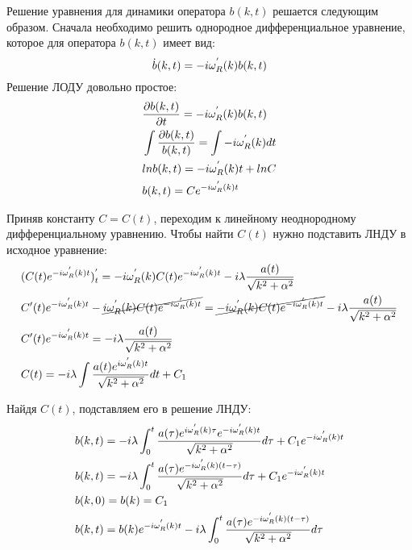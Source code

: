 Решение уравнения для динамики оператора $b(k,t)$ решается следующим образом. Сначала необходимо
решить однородное дифференциальное уравнение, которое для оператора $b(k,t)$ имеет вид:
\begin{equation}\notag
    \dot{b}(k,t) = -i \omega^{'}_{R}(k) b(k,t)
\end{equation}
Решение ЛОДУ довольно простое:
\begin{equation}\notag
    \begin{split}
        & \frac{\partial b(k,t)}{\partial t} = -i \omega^{'}_{R}(k) b(k,t) \\
        & \int \frac{\partial b(k,t)}{b(k,t)} = \int -i \omega^{'}_{R}(k) dt \\
        & ln b(k,t) = -i \omega^{'}_{R}(k) t + ln C \\
        & b(k,t) = Ce^{-i \omega^{'}_{R}(k) t} \\
    \end{split}
\end{equation}

Приняв константу $C = C(t)$, переходим к линейному неоднородному дифференциальному уравнению.
Чтобы найти $C(t)$ нужно подставить ЛНДУ в исходное уравнение:
\begin{equation}\notag
    \begin{split}
        & (C(t)e^{-i \omega^{'}_{R}(k) t})^{'}_{t} = -i \omega^{'}_{R}(k) C(t)e^{-i \omega^{'}_{R}(k) t} -i \lambda \frac{a(t)}{\sqrt{k^{2} + \alpha^{2}}} \\
        & C'(t)e^{-i \omega^{'}_{R}(k) t} - \cancel{i \omega^{'}_{R}(k) C(t)e^{-i \omega^{'}_{R}(k) t}} = \cancel{-i \omega^{'}_{R}(k) C(t)e^{-i \omega^{'}_{R}(k) t}} -i \lambda \frac{a(t)}{\sqrt{k^{2} + \alpha^{2}}} \\
        & C'(t)e^{-i \omega^{'}_{R}(k) t} = -i \lambda \frac{a(t)}{\sqrt{k^{2} + \alpha^{2}}} \\
        & C(t) = -i \lambda \int \frac{a(t)e^{i \omega^{'}_{R}(k) t}}{\sqrt{k^{2} + \alpha^{2}}} dt + C_{1}
    \end{split}
\end{equation}

Найдя $C(t)$, подставляем его в решение ЛНДУ:
\begin{equation}\notag
    \begin{split}
        & b(k,t) = -i \lambda \int_{0}^{t} \frac{a(\tau)e^{i \omega^{'}_{R}(k) \tau}e^{-i \omega^{'}_{R}(k) t}}{\sqrt{k^{2} + \alpha^{2}}} d\tau + C_{1}e^{-i \omega^{'}_{R}(k) t} \\
        & b(k,t) = -i \lambda \int_{0}^{t} \frac{a(\tau)e^{-i \omega^{'}_{R}(k) (t-\tau)}}{\sqrt{k^{2} + \alpha^{2}}} d\tau + C_{1}e^{-i \omega^{'}_{R}(k) t} \\
        & b(k,0) = b(k) = C_{1} \\
        & b(k,t) = b(k)e^{-i \omega^{'}_{R}(k) t} -i \lambda \int_{0}^{t} \frac{a(\tau)e^{-i \omega^{'}_{R}(k) (t-\tau)}}{\sqrt{k^{2} + \alpha^{2}}} d\tau \\
    \end{split}
\end{equation}

